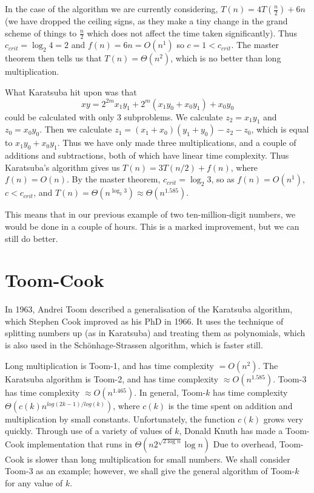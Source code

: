 \documentclass[10pt,a4paper]{article}
\begin{document}
\begin{multicols}{2}
	In the case of the algorithm we are currently considering, \(T(n)=4T(\frac{n}{2})+6n\) (we have dropped the ceiling signs, as they make a tiny change in the grand scheme of things to \(\frac{n}{2}\) which does not affect the time taken significantly). Thus \(c_{crit}=\log_{2}4=2\) and \(f(n)=6n=O(n^1)\) so \(c=1<c_{crit}\). The master theorem then tells us that \(T(n)=\Theta(n^2)\), which is no better than long multiplication.
	
	What Karatsuba hit upon was that \[xy=2^{2m}x_1y_1+2^m(x_1y_0+x_0y_1)+x_0y_0\] could be calculated with only 3 subproblems. We calculate \(z_2=x_1y_1\) and \(z_0=x_0y_0\). Then we calculate \(z_1=(x_1+x_0)(y_1+y_0)-z_2-z_0\), which is equal to \(x_1y_0+x_0y_1\). Thus we have only made three multiplications, and a couple of additions and subtractions, both of which have linear time complexity. Thus Karatsuba's algorithm gives us \(T(n)=3T(n/2)+f(n)\), where \(f(n)=O(n)\). By the master theorem, \(c_{crit}=\log_{2}3\), so as \(f(n)=O(n^1)\), \(c<c_{crit}\), and \(T(n)=\Theta(n^{\log_{2}3})\approx{}\Theta(n^{1.585})\).
	
	This means that in our previous example of two ten-million-digit numbers, we would be done in a couple of hours. This is a marked improvement, but we can still do better.
	
	\section{Toom-Cook}
	In 1963, Andrei Toom described a generalisation of the Karatsuba algorithm, which Stephen Cook improved as his PhD in 1966. It uses the technique of splitting numbers up (as in Karatsuba) and treating them as polynomials, which is also used in the Sch\"onhage-Strassen algorithm, which is faster still.
	
	Long multiplication is Toom-1, and has time complexity \(=O(n^2)\). The Karatsuba algorithm is Toom-2, and has time complexity \(\approx{}O(n^1.585)\). Toom-3 has time complexity \(\approx{}O(n^1.465)\). In general, Toom-\(k\) has time complexity \(\Theta(c(k)n^{log(2k-1)/log(k)})\), where \(c(k)\) is the time spent on addition and multiplication by small constants. Unfortunately, the function \(c(k)\) grows very quickly. Through use of a variety of values of \(k\), Donald Knuth has made a Toom-Cook implementation that runs in \(\Theta(n2^{\sqrt{2\log{}n}}\log{}n)\) Due to overhead, Toom-Cook is slower than long multiplication for small numbers. We shall consider Toom-3 as an example; however, we shall give the general algorithm of Toom-\(k\) for any value of \(k\).
	

\end{multicols}
\end{document}
